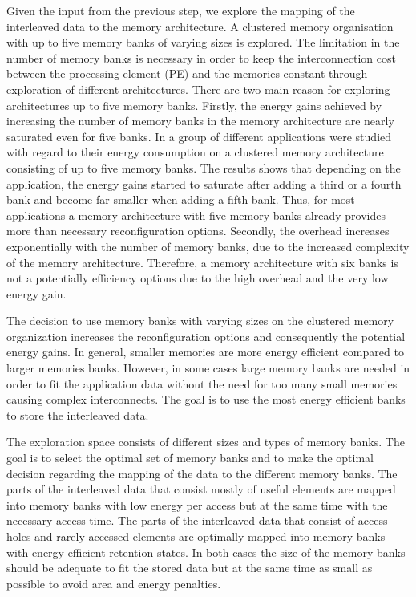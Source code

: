 \documentclass[prodmode,acmtecs]{acmsmall}
\begin{document}
Given the input from the previous step, we explore the mapping of the interleaved data to the memory architecture.
A clustered memory organisation with up to five memory banks of varying sizes is explored. 
The limitation in the number of memory banks is necessary in order to keep the interconnection cost between the processing element (PE) and the memories constant through exploration of different architectures. 
There are two main reason for exploring architectures up to five memory banks.
Firstly, the energy gains achieved by increasing the number of memory banks in the memory architecture are nearly saturated even for five banks.
In \cite{filippopoulos2013exploration} a group of different applications were studied with regard to their energy consumption on a clustered memory architecture consisting of up to five memory banks.
The results shows that depending on the application, the energy gains started to saturate after adding a third or a fourth bank and become far smaller when adding a fifth bank.
Thus, for most applications a memory architecture with five memory banks already provides more than necessary reconfiguration options.  
Secondly, the overhead increases exponentially with the number of memory banks, due to the increased complexity of the memory architecture. 
Therefore, a memory architecture with six banks is not a potentially efficiency options due to the high overhead and the very low energy gain.

The decision to use memory banks with varying sizes on the clustered memory organization increases the reconfiguration options and consequently the potential energy gains. 
In general, smaller memories are more energy efficient compared to larger memories banks. 
However, in some cases large memory banks are needed in order to fit the application data without the need for too many small memories causing complex interconnects. 
The goal is to use the most energy efficient banks to store the interleaved data.

The exploration space consists of different sizes and types of memory banks.
The goal is to select the optimal set of memory banks and to make  the optimal decision regarding the mapping of the data to the different memory banks.
The parts of the interleaved data that consist mostly of useful elements are mapped into memory banks with low energy per access but at the same time with the necessary access time.
The parts of the interleaved data that consist of access holes and rarely accessed elements are optimally mapped into memory banks with energy efficient retention states.
In both cases the size of  the memory banks should be adequate to fit the stored data but at the same time as small as possible to avoid area and energy penalties.
\end{document}
